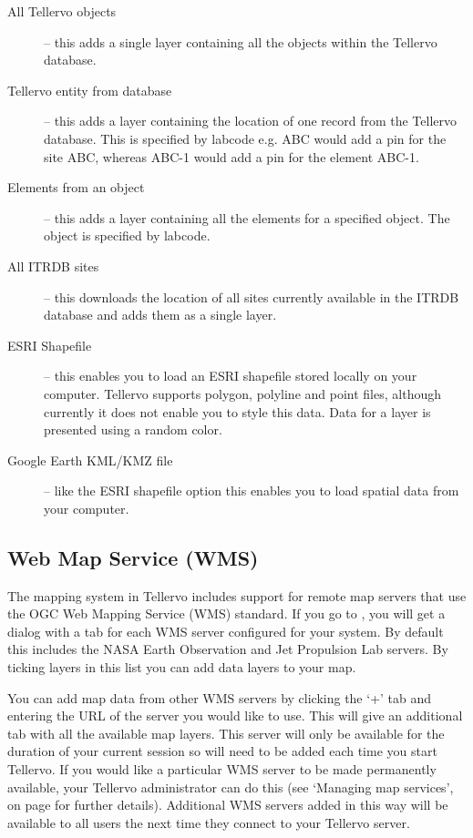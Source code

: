 \begin{description}
 \item[All Tellervo objects] -- this adds a single layer containing all the objects within the Tellervo database.
 \item[Tellervo entity from database] -- this adds a layer containing the location of one record from the Tellervo database.  This is specified by labcode e.g. ABC would add a pin for the site ABC, whereas ABC-1 would add a pin for the element ABC-1.
 \item[Elements from an object] -- this adds a layer containing all the elements for a specified object.  The object is specified by labcode.
 \item[All ITRDB sites] -- this downloads the location of all sites currently available in the ITRDB database and adds them as a single layer.
 \item[ESRI Shapefile] -- this enables you to load an ESRI shapefile stored locally on your computer.  Tellervo supports polygon, polyline and point files, although currently it does not enable you to style this data.  Data for a layer is presented using a random color.
 \item[Google Earth KML/KMZ file] -- like the ESRI shapefile option this enables you to load spatial data from your computer.
 \end{description}


\subsection{Web Map Service (WMS)}

The mapping system in Tellervo includes support for remote map servers that use the OGC Web Mapping Service (WMS) standard. If you go to , you will get a dialog with a tab for each WMS server configured for your system. By default this includes the NASA Earth Observation and Jet Propulsion Lab servers.  By ticking layers in this list you can add data layers to your map.

You can add map data from other WMS servers by clicking the `+' tab and entering the URL of the server you would like to use.  This will give an additional tab with all the available map layers.  This server will only be available for the duration of your current session so will need to be added each time you start Tellervo.  If you would like a particular WMS server to be made permanently available, your Tellervo administrator can do this (see `Managing map services', on page \pageref{txt:managingmaps} for further details).  Additional WMS servers added in this way will be available to all users the next time they connect to your Tellervo server.


